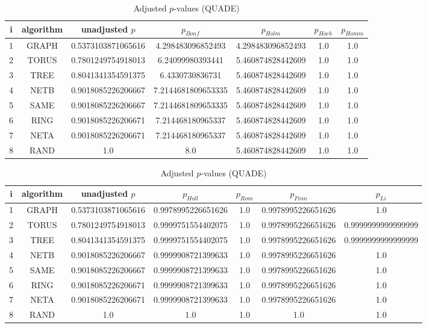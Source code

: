 \documentclass[a4paper,10pt]{article}
\begin{document}
\begin{landscape}
\newpage

\begin{table}[!htp]
\centering\scriptsize
\caption{Adjusted $p$-values (QUADE)}
\begin{tabular}{ccccccc}
i&algorithm&unadjusted $p$&$p_{Bonf}$&$p_{Holm}$&$p_{Hoch}$&$p_{Homm}$\\
\hline
1& GRAPH&0.5373103871065616&4.298483096852493&4.298483096852493&1.0&1.0\\
2& TORUS&0.7801249754918013&6.24099980393441&5.460874828442609&1.0&1.0\\
3& TREE&0.8041341354591375&6.4330730836731&5.460874828442609&1.0&1.0\\
4& NETB&0.9018085226206667&7.2144681809653335&5.460874828442609&1.0&1.0\\
5& SAME&0.9018085226206667&7.2144681809653335&5.460874828442609&1.0&1.0\\
6& RING&0.9018085226206671&7.214468180965337&5.460874828442609&1.0&1.0\\
7& NETA&0.9018085226206671&7.214468180965337&5.460874828442609&1.0&1.0\\
8& RAND&1.0&8.0&5.460874828442609&1.0&1.0\\
\hline
\end{tabular}
\end{table}

\begin{table}[!htp]
\centering\scriptsize
\caption{Adjusted $p$-values (QUADE)}
\begin{tabular}{ccccccc}
i&algorithm&unadjusted $p$&$p_{Holl}$&$p_{Rom}$&$p_{Finn}$&$p_{Li}$\\
\hline
1& GRAPH&0.5373103871065616&0.9978995226651626&1.0&0.9978995226651626&1.0\\
2& TORUS&0.7801249754918013&0.9999751554402075&1.0&0.9978995226651626&0.9999999999999999\\
3& TREE&0.8041341354591375&0.9999751554402075&1.0&0.9978995226651626&0.9999999999999999\\
4& NETB&0.9018085226206667&0.9999908721399633&1.0&0.9978995226651626&1.0\\
5& SAME&0.9018085226206667&0.9999908721399633&1.0&0.9978995226651626&1.0\\
6& RING&0.9018085226206671&0.9999908721399633&1.0&0.9978995226651626&1.0\\
7& NETA&0.9018085226206671&0.9999908721399633&1.0&0.9978995226651626&1.0\\
8& RAND&1.0&1.0&1.0&1.0&1.0\\
\hline
\end{tabular}
\end{table}

\end{landscape}
\end{document}
